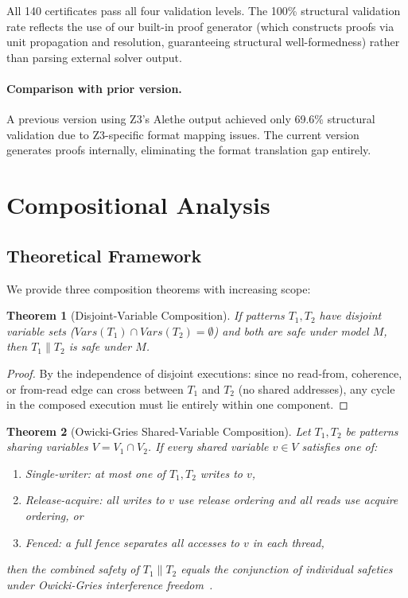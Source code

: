 \documentclass[11pt]{article}
\newtheorem{theorem}{Theorem}
\begin{document}
\noindent
All 140 certificates pass all four validation levels.
The 100\% structural validation rate reflects the use of
our built-in proof generator (which constructs proofs
via unit propagation and resolution, guaranteeing structural
well-formedness) rather than parsing external solver output.

\paragraph{Comparison with prior version.}
A previous version using Z3's Alethe output achieved only
69.6\% structural validation due to Z3-specific format mapping
issues. The current version generates proofs internally,
eliminating the format translation gap entirely.

\section{Compositional Analysis}
\label{sec:composition}

\subsection{Theoretical Framework}

We provide three composition theorems with increasing scope:

\begin{theorem}[Disjoint-Variable Composition]
\label{thm:disjoint}
If patterns $T_1, T_2$ have disjoint variable sets
($\mathit{Vars}(T_1) \cap \mathit{Vars}(T_2) = \emptyset$)
and both are safe under model $M$, then $T_1 \| T_2$ is
safe under $M$.
\end{theorem}

\begin{proof}
By the independence of disjoint executions: since no
read-from, coherence, or from-read edge can cross between
$T_1$ and $T_2$ (no shared addresses), any cycle in the
composed execution must lie entirely within one component.
\end{proof}

\begin{theorem}[Owicki-Gries Shared-Variable Composition]
\label{thm:owicki-gries}
Let $T_1, T_2$ be patterns sharing variables $V = V_1 \cap V_2$.
If every shared variable $v \in V$ satisfies one of:
\begin{enumerate}[nosep,label=(\alph*)]
  \item \emph{Single-writer:} at most one of $T_1, T_2$ writes to $v$,
  \item \emph{Release-acquire:} all writes to $v$ use release ordering
    and all reads use acquire ordering, or
  \item \emph{Fenced:} a full fence separates all accesses to $v$
    in each thread,
\end{enumerate}
then the combined safety of $T_1 \| T_2$ equals the conjunction
of individual safeties under Owicki-Gries interference
freedom~\cite{OwickiGries1976}.
\end{theorem}
\end{document}
